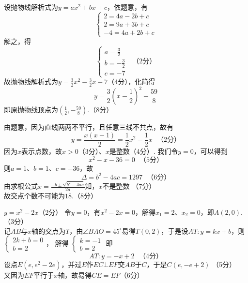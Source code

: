 \documentclass[10pt]{article}
\begin{document}
\setcounter{taskcounter}{16}
\begin{questions}{\answeringintroduction}
    \question 设抛物线解析式为$y=ax^2+bx+c$，依题意，有
    $$\begin{cases}
        2 = 4a - 2b + c \\
        2 = 9a + 3b + c \\
        -4 = 4a + 2b + c
    \end{cases}$$
    解之，得
    $$\begin{cases}
        a = \frac{3}{2} \\
        b = -\frac{3}{2} \\
        c = -7
    \end{cases} \ \ \ （2分）$$
    故抛物线解析式为$y=\frac{3}{2}x^2-\frac{3}{2}x-7$（4分），化简得
    $$y=\frac{3}{2}\left(x-\frac{1}{2}\right)^2-\frac{59}{8}$$
    即原抛物线顶点为$\left(\frac{1}{2},-\frac{59}{8}\right)$.（8分）
    \question %
    \begin{subquestions}
        \subquestion 由题意，因为直线两两不平行，且任意三线不共点，故有
        $$y=\frac{x(x-1)}{2}=\frac{1}{2}x^2-\frac{1}{2}x \ \ \ （2分）$$
        因为$x$表示点数，故$x > 0$（3分）、$x$是整数（4分）.
        \subquestion 我们令$y=0$，可以得到
        $$x^2-x-36=0 \ \ \ （5分）$$
        则$a=1、b=1、c=-36$，故
        $$\Delta = b^2-4ac = 1297 \ \ \ （6分）$$
        由求根公式$x=\frac{-b \pm \sqrt{b^2-4ac}}{2a}$知，$x$不是整数 （7分）\\
        故交点个数不可能为$18$.（8分）
    \end{subquestions}
    \question %
    \begin{subquestions}
        \subquestion $y=x^2-2x$（2分）
        \subquestion 令$y=0$，有$x^2-2x=0$，解得$x_1=2、x_2=0$，即$A(2,0)$.（3分）\\
        记$AB$与$x$轴的交点为$T$，由$\angle BAO=45^{\circ}$易得$T(0,2)$，于是设$AT:y=kx+b$，则
        $\begin{cases}
            2k+b=0 \\
            b=2
        \end{cases}$，
        解得
        $\begin{cases}
            k=-1 \\
            b=2
        \end{cases}$
        即
        $$AT:y=-x+2 \ \ \ （4分）$$
        设点$E(e,e^2-2e)$，并过$E$作$EC \bot EF$交$AB$于$C$，于是$C(e,-e+2)$ （5分）\\
        又因为$EF$平行于$x$轴，故易得$CE=EF$（6分）\\

\end{subquestions}
\end{questions}
\end{document}
